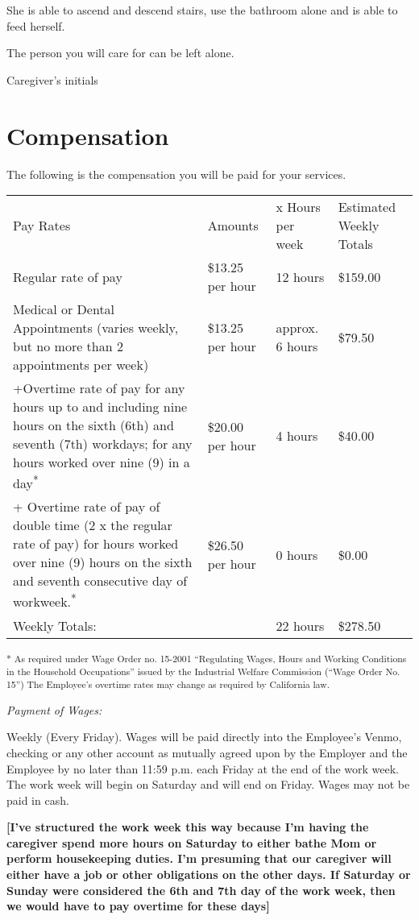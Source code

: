 \documentclass[]{article}
\newcommand{\initialfillin}{\hspace{0.2cm}\makebox[1.5cm]{\hrulefill}}
\begin{document}
She is able to ascend and descend stairs, use the bathroom alone and is able to feed herself.

The person you will care for can be left alone.

Caregiver's initials \initialfillin{}

\section{Compensation}

The following is the compensation you will be paid for your services.

\begin{longtable}[c]{@{}llll@{}}
\toprule
Pay Rates & Amounts & x Hours per week & Estimated Weekly
Totals\tabularnewline
Regular rate of pay & \$13.25 per hour & 12 hours &
\$159.00\tabularnewline
Medical or Dental Appointments (varies weekly, but no more than 2
appointments per week) & \$13.25 per hour & approx. 6 hours &
\$79.50\tabularnewline
+Overtime rate of pay for any hours up to and including nine hours on
the sixth (6th) and seventh (7th) workdays; for any hours worked over
nine (9) in a day\textsuperscript{*} & \$20.00 per hour & 4 hours &
\$40.00\tabularnewline
+ Overtime rate of pay of double time (2 x the regular rate of pay) for
hours worked over nine (9) hours on the sixth and seventh consecutive
day of workweek.\textsuperscript{*} & \$26.50 per hour & 0 hours &
\$0.00\tabularnewline
Weekly Totals: & & 22 hours & \$278.50\tabularnewline
\bottomrule
\end{longtable}

\textsuperscript{* As required under Wage Order no. 15-2001 ``Regulating
Wages, Hours and Working Conditions in the Household Occupations''
issued by the Industrial Welfare Commission (``Wage Order No. 15'') The
Employee's overtime rates may change as required by California law. }

\emph{Payment of Wages:}

Weekly (Every Friday). Wages will be paid directly into the Employee's
Venmo, checking or any other account as mutually agreed upon by the
Employer and the Employee by no later than 11:59 p.m. each Friday at the
end of the work week. The work week will begin on Saturday and will end
on Friday. Wages may not be paid in cash.

\textbf{{[}I've structured the work week this way because I'm having the
caregiver spend more hours on Saturday to either bathe Mom or perform
housekeeping duties. I'm presuming that our caregiver will either have a
job or other obligations on the other days. If Saturday or Sunday were
considered the 6th and 7th day of the work week, then we would have to
pay overtime for these days{]}}
\end{document}
